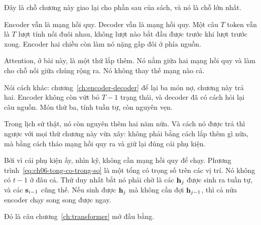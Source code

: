 %
Đây là chỗ chương này giao lại cho phần sau của sách, và nó là chỗ lớn nhất.

Encoder vẫn là mạng hồi quy. Decoder vẫn là mạng hồi quy. Một câu \(T\) token vẫn là \(T\) lượt tính nối đuôi nhau, không lượt
nào bắt đầu được trước khi lượt trước xong. Encoder hai chiều còn làm nó nặng
gấp đôi ở phía nguồn.

Attention, ở bài này, là một thứ lắp thêm. Nó nằm giữa hai mạng hồi quy và làm
cho chỗ nối giữa chúng rộng ra. Nó không thay thế mạng nào cả.

Nói cách khác: chương~\ref{ch:encoder-decoder} để lại ba món nợ, chương này trả
hai. Encoder không còn vứt bỏ \(T - 1\) trạng thái, và decoder đã có cách hỏi
lại câu nguồn. Món thứ ba, tính tuần tự, còn nguyên vẹn.

%
Trong lịch sử thật, nó còn nguyên thêm hai năm nữa. Và cách nó được trả thì
ngược với mọi thứ chương này vừa xây: không phải bằng cách lắp thêm gì nữa, mà
bằng cách tháo mạng hồi quy ra và giữ lại đúng cái phụ kiện.

Bởi vì cái phụ kiện ấy, nhìn kỹ, không cần mạng hồi quy để chạy.
Phương trình~\eqref{eq:ch06-tong-co-trong-so} là một tổng có trọng số trên các
vị trí. Nó không có \(t-1\) ở đâu cả. Thứ duy nhất bắt nó phải chờ là các
\(\mathbf{h}_j\) được sinh ra tuần tự, và các \(\mathbf{s}_{i-1}\) cũng thế. Nếu
sinh được \(\mathbf{h}_j\) mà không cần đợi \(\mathbf{h}_{j-1}\), thì cả nửa
encoder chạy song song được ngay.

Đó là câu chương~\ref{ch:transformer} mở đầu bằng.
